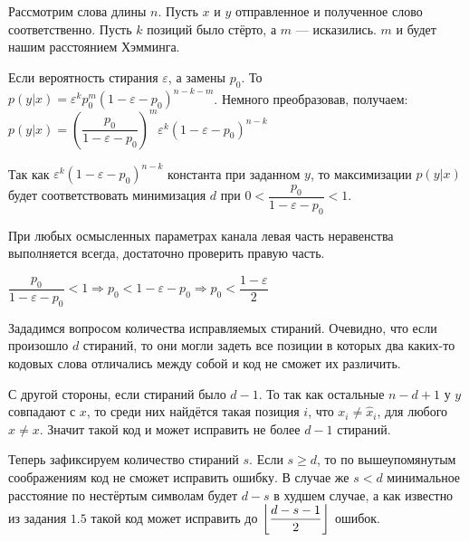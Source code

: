 \documentclass[fontsize=12pt]{article}
\DeclarePairedDelimiter\floor{\lfloor}{\rfloor}
\begin{document}
Рассмотрим слова длины $n$. Пусть $x$ и $y$ отправленное и полученное слово соответственно. Пусть $k$ позиций было стёрто, а $m$ --- исказились. $m$ и будет нашим расстоянием Хэмминга. 

Если вероятность стирания $\varepsilon$, а замены $p_0$. То $p(y|x) = \varepsilon^k  p_0^m (1 - \varepsilon - p_0)^{n - k - m}$. Немного преобразовав, получаем: $p(y|x) = \left( \dfrac{p_0}{1 - \varepsilon - p_0} \right)^m \varepsilon^k (1 - \varepsilon - p_0)^{n - k}$

Так как $\varepsilon^k (1 - \varepsilon - p_0)^{n - k}$ константа при заданном $y$, то максимизации $p(y|x)$ будет соответствовать минимизация $d$ при $0 < \dfrac{p_0}{1 - \varepsilon - p_0} < 1$. 

При любых осмысленных параметрах канала левая часть неравенства выполняется всегда, достаточно проверить правую часть.

$\dfrac{p_0}{1 - \varepsilon - p_0} < 1 \Rightarrow 
p_0 < 1 - \varepsilon - p_0 \Rightarrow
p_0 < \dfrac{1 - \varepsilon}{2}$

Зададимся вопросом количества исправляемых стираний. Очевидно, что если произошло $d$ стираний, то они могли задеть все позиции в которых два каких-то кодовых слова отличались между собой и код не сможет их различить.

С другой стороны, если стираний было $d - 1$. То так как остальные $n - d + 1$ у $y$ совпадают с $x$, то среди них найдётся такая позиция $i$, что $x_i \neq \widehat{x}_i$, для любого $\widehat{x} \neq x$. Значит такой код и может исправить не более $d - 1$ стираний.

Теперь зафиксируем количество стираний $s$. Если $s \geq d$, то по вышеупомянутым соображениям код не сможет исправить ошибку. В случае же $s < d$ минимальное расстояние по нестёртым символам будет $d - s$ в худшем случае, а как известно из задания $1.5$ такой код может исправить до $\floor*{\dfrac{d - s - 1}{2}}$ ошибок.
\end{document}
